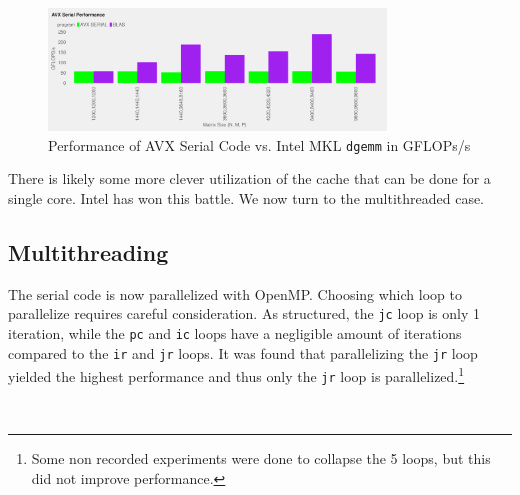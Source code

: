 \documentclass{article}
\begin{document}
\begin{figure}[H]
    \centering
    \includegraphics[width=0.8\textwidth]{../../project/out/avx-serial-gflops.pdf}
    \caption{Performance of AVX Serial Code vs. Intel MKL \texttt{dgemm} in GFLOPs/s}
    \label{FIG:AVX-SERIAL-GFLOPS}
\end{figure}
\noindent There is likely some more clever utilization of the cache that can be done for a single core. 
Intel has won this battle. We now turn to the multithreaded case.

\subsection{Multithreading}
The serial code is now parallelized with OpenMP. Choosing which loop to parallelize requires careful consideration. 
As structured, the \texttt{jc} loop is only 1 iteration, while the \texttt{pc} and \texttt{ic} loops have 
a negligible amount of iterations compared to the \texttt{ir} and \texttt{jr} loops. It 
was found that parallelizing the \texttt{jr} loop yielded the highest performance and thus only the \texttt{jr} loop is parallelized.\footnote{Some non recorded experiments were done to collapse the 5 loops, but this did not improve performance.}

\
\end{document}
